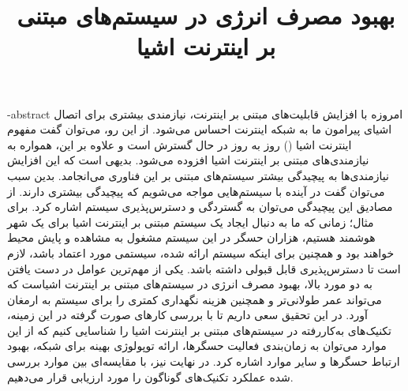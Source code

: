 \documentclass[oneside,openany,mscS]{SBU-Thesis}
\begin{document}
	\title{بهبود مصرف انرژی در سیستم‌های مبتنی بر اینترنت اشیا}
	
	\subject{مهندسی کامپیوتر}
	
	
	


	
	

	\fa-abstract{
امروزه با افزایش قابلیت‌های مبتنی بر اینترنت، نیازمندی بیشتری برای اتصال اشیای پیرامون ما به شبکه اینترنت احساس می‌شود. از این رو، می‌توان گفت مفهوم اینترنت اشیا () روز به روز در حال گسترش است و علاوه بر این، همواره به نیازمندی‌های مبتنی بر اینترنت اشیا افزوده می‌شود. بدیهی است که این افزایش نیازمندی‌ها به پیچیدگی بیشتر سیستم‌های مبتنی بر این فناوری می‌انجامد. بدین سبب می‌توان گفت در آینده با سیستم‌هایی مواجه می‌شویم که پیچیدگی بیشتری دارند. از مصادیق این پیچیدگی می‌توان به گستردگی و دسترس‌پذیری سیستم اشاره کرد. برای مثال؛ زمانی که ما به دنبال ایجاد یک سیستم مبتنی بر اینترنت اشیا برای یک شهر هوشمند هستیم، هزاران حسگر در این سیستم مشغول به مشاهده و پایش محیط خواهند بود و همچنین برای اینکه سیستم ارائه شده، سیستمی مورد اعتماد باشد، لازم است تا دسترس‌پذیری قابل قبولی داشته باشد. یکی از مهم‌ترین عوامل در دست یافتن به دو مورد بالا، بهبود مصرف انرژی در سیستم‌های مبتنی بر اینترنت اشیاست که می‌تواند عمر طولانی‌تر و همچنین هزینه نگهداری کمتری را برای سیستم به ارمغان آورد. در این تحقیق سعی داریم تا با بررسی کارهای صورت گرفته در این زمینه، تکنیک‌های به‌کاررفته در سیستم‌های مبتنی بر اینترنت اشیا را شناسایی کنیم که از این موارد می‌توان به زمان‌بندی فعالیت حسگرها، ارائه توپولوژی بهینه برای شبکه، بهبود ارتباط حسگرها و سایر موارد اشاره کرد. در نهایت نیز، با مقایسه‌ای بین موارد بررسی شده عملکرد تکنیک‌های گوناگون را مورد ارزیابی قرار می‌دهیم. 
	}

\firstPage
\abstractPage %


\tableofcontents %
\listoffigures \newpage %






	
\newpage

\end{document}
